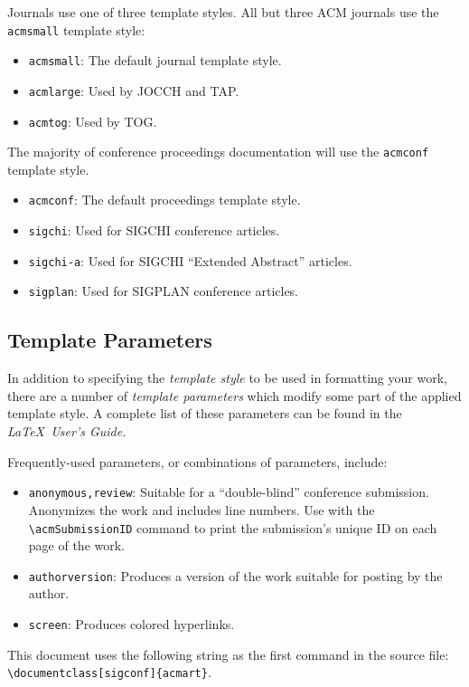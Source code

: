 \documentclass[acmlarge,11pt]{acmart}
\begin{document}
Journals use one of three template styles. All but three ACM journals
use the {\verb|acmsmall|} template style:
\begin{itemize}
\item {\verb|acmsmall|}: The default journal template style.
\item {\verb|acmlarge|}: Used by JOCCH and TAP.
\item {\verb|acmtog|}: Used by TOG.
\end{itemize}

The majority of conference proceedings documentation will use the {\verb|acmconf|} template style.
\begin{itemize}
\item {\verb|acmconf|}: The default proceedings template style.
\item{\verb|sigchi|}: Used for SIGCHI conference articles.
\item{\verb|sigchi-a|}: Used for SIGCHI ``Extended Abstract'' articles.
\item{\verb|sigplan|}: Used for SIGPLAN conference articles.
\end{itemize}

\subsection{Template Parameters}

In addition to specifying the {\itshape template style} to be used in
formatting your work, there are a number of {\itshape template parameters}
which modify some part of the applied template style. A complete list
of these parameters can be found in the {\itshape \LaTeX\ User's Guide.}

Frequently-used parameters, or combinations of parameters, include:
\begin{itemize}
\item {\verb|anonymous,review|}: Suitable for a ``double-blind''
  conference submission. Anonymizes the work and includes line
  numbers. Use with the \verb|\acmSubmissionID| command to print the
  submission's unique ID on each page of the work.
\item{\verb|authorversion|}: Produces a version of the work suitable
  for posting by the author.
\item{\verb|screen|}: Produces colored hyperlinks.
\end{itemize}

This document uses the following string as the first command in the
source file:
\verb|\documentclass[sigconf]{acmart}|.
\end{document}
